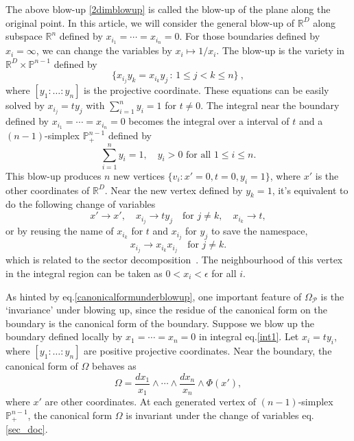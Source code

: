 \documentclass[12pt]{article}
\theoremstyle{definition}
\theoremstyle{plain}
\newcommand{\dif}{\mathrm{d}} %
\begin{document}
The above blow-up \eqref{2dimblowup} is called the blow-up of the plane along the original point. In this article, we will consider the general blow-up of $\mathbb R^D$ along subspace $\mathbb R^n$ defined by $x_{i_1}=\cdots=x_{i_n}=0$. For those boundaries defined by %
$x_{i}=\infty$, we can change the variables by $x_i\mapsto 1/x_i$.
The blow-up is the variety in $\mathbb R^{D}\times \mathbb P^{n-1}$ defined by 
\begin{equation}
	\{x_{i_j}y_k=x_{i_k}y_j\,:\, 1\leq j<k\leq n\}\:,  \label{genblowup}
\end{equation}
where $[y_1:\dots:y_n]$ is the projective coordinate. These equations can be easily solved by $x_{i_j}=ty_{j}$ with
$\sum_{i=1}^n y_i=1$ for $t\neq 0$. 
The integral near the boundary defined by $x_{i_1}=\cdots=x_{i_n}=0$ becomes the integral over a interval of $t$ and a $(n-1)$-simplex $\mathbb P_+^{n-1}$ 
defined by
\[
	\sum_{i=1}^n y_i=1,\quad \text{$y_i>0$ for all $1\leq i\leq n$}.
\]
This blow-up produces $n$ new vertices 
$
	\{v_i:x'=0,t=0,y_i=1\}
$, where $x'$ is the other coordinates of $\mathbb R^D$.
Near the new vertex defined by $y_k=1$, it's equivalent to do 
the following change of variables
\[
	x'\to x',\quad x_{i_j}\to ty_j\quad \text{for $j\neq k$},\quad x_{i_k}\to t,
\]
or by reusing the name of $x_{i_k}$ for $t$ and $x_{i_j}$ 
for $y_j$ to save the namespace,
\begin{equation}\label{sec_doc}
	x_{i_j}\to x_{i_k}x_{i_j}\quad \text{for $j\neq k$}.
\end{equation}
which is related to the sector decomposition~\cite{Heinrich:2008si}. 
The neighbourhood of this vertex in the integral region 
can be taken as $0<x_i<\epsilon$ for all $i$.


As hinted by eq.\eqref{canonicalformunderblowup}, one important feature of $\Omega_{\mathcal P}$ is the `invariance' under blowing up, 
since the residue of the canonical form on the boundary is
the canonical form of the boundary.
Suppose we blow up the boundary defined locally by $x_1=\cdots=x_n=0$ in integral eq.\eqref{int1}. 
Let $x_i=ty_i$, where $[y_1:\dots:y_n]$ are positive projective coordinates. 
Near the boundary, the canonical form of $\Omega$ behaves as 
\[
	\Omega=\frac{dx_1}{x_1}\wedge \cdots\wedge\frac{dx_n}{x_n}
	\wedge \Phi(x'),
\]
where $x'$ are other coordinates. 
At each generated vertex of $(n-1)$-simplex $\mathbb P_+^{n-1}$, the canonical
form $\Omega$ is invariant under the change of variables eq.\eqref{sec_doc}.
\end{document}
